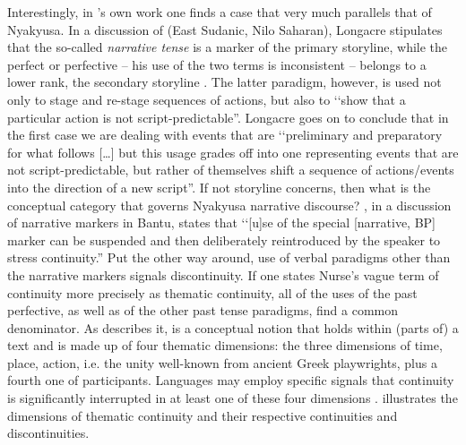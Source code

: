 Interestingly, in \citeauthor{LongacreR1990}'s own work one finds a case that very much parallels that of Nyakyusa. In a discussion of  (East Sudanic, Nilo Saharan), Longacre stipulates that the so-called \textit{narrative tense} is a marker of the primary storyline, while the perfect or perfective -- his use of the two terms is inconsistent -- belongs to a lower rank, the secondary storyline \citep[91--97]{LongacreR1990}. The latter paradigm, however, is used not only to stage and re-stage sequences of actions, but also to \lq\lq show that a particular action is not script-predictable''. Longacre goes on to conclude that in the first case we are dealing with events that are \lq\lq preliminary and preparatory for what follows [\ldots] but this usage grades off into one representing events that are not script-predictable, but rather of themselves shift a sequence of actions/events into the direction of a new script''.
If not storyline concerns, then what is the conceptual category that governs Nyakyusa narrative discourse? \citet[120]{NurseD2008}, in a discussion of narrative markers in Bantu, states that \lq\lq [u]se of the special [narrative, BP] marker can be suspended and then deliberately reintroduced by the speaker to stress continuity.'' Put the other way around, use of verbal paradigms other than the narrative markers signals discontinuity. If one states Nurse's vague term of continuity more precisely as thematic continuity, all of the uses of the past perfective, as well as of the other past tense paradigms, find a common denominator. As \citet{GivonT1984} describes it,  is a conceptual notion that holds within (parts of) a text and is made up of four thematic dimensions: the three dimensions of time, place, action, i.e. the unity well-known from ancient Greek playwrights, plus a fourth one of participants. Languages may employ specific signals that continuity is significantly interrupted in at least one of these four dimensions \citep{DooleyRALevinsohnSH2000}.  illustrates the dimensions of thematic continuity and their respective continuities and discontinuities.

